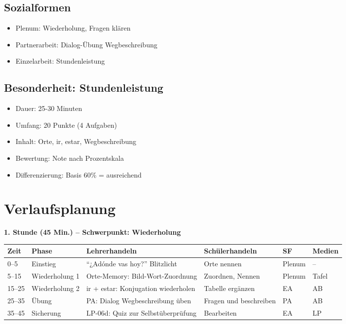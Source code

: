 \documentclass[11pt,a4paper]{article}
\begin{document}
\subsection{Sozialformen}
\begin{itemize}
    \item Plenum: Wiederholung, Fragen klären
    \item Partnerarbeit: Dialog-Übung Wegbeschreibung
    \item Einzelarbeit: Stundenleistung
\end{itemize}

\subsection{Besonderheit: Stundenleistung}
\begin{itemize}
    \item Dauer: 25-30 Minuten
    \item Umfang: 20 Punkte (4 Aufgaben)
    \item Inhalt: Orte, ir, estar, Wegbeschreibung
    \item Bewertung: Note nach Prozentskala
    \item Differenzierung: Basis 60\% = ausreichend
\end{itemize}

\section{Verlaufsplanung}

\textbf{1. Stunde (45 Min.) -- Schwerpunkt: Wiederholung}

\begin{longtable}{|p{1cm}|p{1.5cm}|p{4cm}|p{3cm}|p{2cm}|p{2cm}|}
\hline
\textbf{Zeit} & \textbf{Phase} & \textbf{Lehrerhandeln} & \textbf{Schülerhandeln} & \textbf{SF} & \textbf{Medien} \\
\hline
\endhead

0--5 & Einstieg & ``¿Adónde vas hoy?'' Blitzlicht & Orte nennen & Plenum & -- \\
\hline

5--15 & Wiederholung 1 & Orte-Memory: Bild-Wort-Zuordnung & Zuordnen, Nennen & Plenum & Tafel \\
\hline

15--25 & Wiederholung 2 & ir + estar: Konjugation wiederholen & Tabelle ergänzen & EA & AB \\
\hline

25--35 & Übung & PA: Dialog Wegbeschreibung üben & Fragen und beschreiben & PA & AB \\
\hline

35--45 & Sicherung & LP-06d: Quiz zur Selbstüberprüfung & Bearbeiten & EA & LP \\
\hline
\end{longtable}
\end{document}
